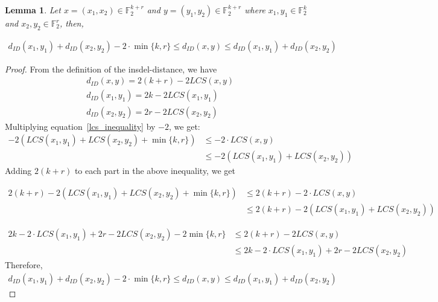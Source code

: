 \documentclass[11 pt]{article}
\numberwithin{equation}{section}
\newtheorem{lemma}[theorem]{Lemma}
\begin{document}
    \begin{lemma}\label{insdel_inequality}
          Let $x = (x_1, x_2) \in \mathbb{F}_2^{k+r}$ and $y = (y_1, y_2) \in \mathbb{F}_2^{k+r}$ where $x_1, y_1 \in \mathbb{F}_2^k$ and $x_2, y_2 \in  \mathbb{F}_2^r$, then,
          
        \begin{equation}\label{insdel_partition}
              \begin{multlined}
                d_{ID}(x_1, y_1) + d_{ID}(x_2, y_2) - 2 \cdot \min\{k,r\}\leq d_{ID}(x,y) \leq d_{ID}(x_1, y_1) + d_{ID}(x_2, y_2) 
              \end{multlined}    
        \end{equation}           
    \end{lemma}
    
    \begin{proof}
        From the definition of the insdel-distance, we have
        \begin{align*}
            &d_{ID}(x, y) = 2(k+r) - 2LCS(x,y)\\
            &d_{ID}(x_1, y_1) = 2k - 2LCS(x_1,y_1)\\
            &d_{ID}(x_2,y_2) = 2r - 2LCS(x_2, y_2)
        \end{align*}
        Multiplying equation~\eqref{lcs_inequality} by $-2$, we get:
        \begin{align*}
            -2(LCS(x_1, y_1) + LCS(x_2, y_2) + \min\{k,r\})&\leq -2 \cdot LCS(x,y)\\
                                                         &\leq  -2(LCS(x_1, y_1) + LCS(x_2, y_2))
        \end{align*}
        Adding $2(k+r)$ to each part in the above inequality, we get
        
        \begin{align*}
            2(k+r) - 2(LCS(x_1, y_1) + LCS(x_2, y_2) + \min\{k,r\})& \leq  2(k+r) -2 \cdot LCS(x,y)\\
                                                                 &\leq  2(k+r) -2(LCS(x_1, y_1) + LCS(x_2, y_2))
        \end{align*}
        
        
        \begin{align*}
            2k - 2 \cdot LCS(x_1, y_1) + 2r - 2LCS(x_2, y_2) - 2\min\{k,r\} &\leq  2(k+r) - 2LCS(x,y)\\
                                                                               &\leq 2k - 2 \cdot LCS(x_1, y_1) + 2r - 2LCS(x_2, y_2)
        \end{align*}
        Therefore,
        \begin{align*}
            d_{ID}(x_1, y_1) + d_{ID}(x_2, y_2) - 2 \cdot \min\{k,r\} \leq d_{ID}(x,y)
                                                                     \leq d_{ID}(x_1, y_1) + d_{ID}(x_2, y_2)
        \end{align*}        
    \end{proof}
\end{document}
